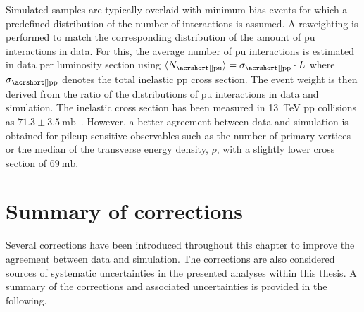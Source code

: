Simulated samples are typically overlaid with minimum bias events for which a predefined distribution of the number of  interactions is assumed. A reweighting is performed to match the corresponding distribution of the amount of \gls{pu} interactions in data. For this, the average number of \gls{pu} interactions is estimated in data per luminosity section using $\langle N_\mathrm{\gls{pu}}\rangle=\sigma_\mathrm{\gls{pp}}\cdot L$ where $\sigma_\mathrm{\gls{pp}}$ denotes the total inelastic \gls{pp} cross section. The event weight is then derived from the ratio of the distributions of \gls{pu} interactions in data and simulation. The inelastic cross section has been measured in 13~TeV \gls{pp} collisions as $71.3\pm3.5~\mathrm{mb}$~\cite{CMS-PAS-FSQ-15-005}. However, a better agreement between data and simulation is obtained for pileup sensitive observables such as the number of primary vertices or the median of the transverse energy density, $\rho$, with a slightly lower cross section of $69~\mathrm{mb}$. 


\section{Summary of corrections}
\label{sec:reconstruction-summary}

Several corrections have been introduced throughout this chapter to improve the agreement between data and simulation. The corrections are also considered sources of systematic uncertainties in the presented analyses within this thesis. A summary of the corrections and associated uncertainties is provided in the following.

